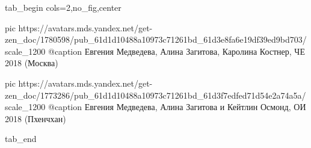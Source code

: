  
 
 
 
 


\ifcmt
  tab_begin cols=2,no_fig,center

     pic https://avatars.mds.yandex.net/get-zen_doc/1780598/pub_61d1d10488a10973c71261bd_61d3e8fa6e19df39ed9bd703/scale_1200
		 @caption Евгения Медведева, Алина Загитова, Каролина Костнер, ЧЕ 2018 (Москва)

		 pic https://avatars.mds.yandex.net/get-zen_doc/1773286/pub_61d1d10488a10973c71261bd_61d3f7edfed71d54e2a74a5a/scale_1200
		 @caption Евгения Медведева, Алина Загитова и Кейтлин Осмонд, ОИ 2018 (Пхенчхан) 

  tab_end
\fi
